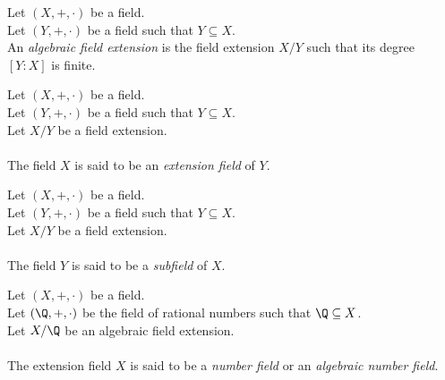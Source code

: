 \begin{definition-pre}
    \label{def:field_extension}
    Let $(X, +, \cdot)$ be a field. \\
    Let $(Y, +, \cdot)$ be a field such that $Y \subseteq X$. \\
    An \textit{algebraic field extension} is the field extension $X/Y$ such that its degree $[Y:X]$
    is finite.
\end{definition-pre}

\begin{definition-pre}
    \label{def:extension_field}
    Let $(X, +, \cdot)$ be a field. \\
    Let $(Y, +, \cdot)$ be a field such that $Y \subseteq X$. \\
    Let $X/Y$ be a field extension. \\\\
    The field $X$ is said to be an \textit{extension field} of $Y$.
\end{definition-pre}

\begin{definition-pre}[Subfield]
    \label{def:subfield}
    Let $(X, +, \cdot)$ be a field. \\
    Let $(Y, +, \cdot)$ be a field such that $Y \subseteq X$. \\
    Let $X/Y$ be a field extension. \\\\
    The field $Y$ is said to be a \textit{subfield} of $X$.
\end{definition-pre}

\begin{definition-pre}
    \label{def:number_field}
    Let $(X, +, \cdot)$ be a field. \\
    Let $(\Q, +, \cdot)$ be the field of rational numbers such that $\Q \subseteq X$. \\
    Let $X/\Q$ be an algebraic field extension. \\\\
    The extension field $X$ is said to be a \textit{number field} or an \textit{algebraic number field}.
\end{definition-pre}



